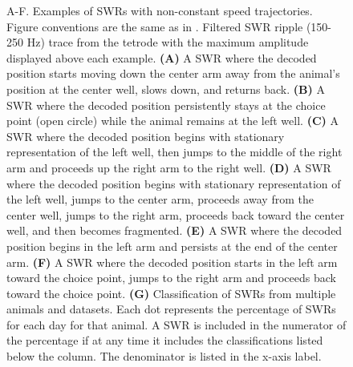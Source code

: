 \documentclass[9pt,lineno]{elife}
\begin{document}
\begin{figure}
\caption{A-F. Examples of SWRs with non-constant speed trajectories. Figure conventions are the same as in . Filtered SWR ripple (150-250 Hz) trace from the tetrode with the maximum amplitude displayed above each example. \textbf{(A)} A SWR where the decoded position starts moving down the center arm away from the animal's position at the center well, slows down, and returns back. \textbf{(B)} A SWR where the decoded position persistently stays at the choice point (open circle) while the animal remains at the left well. \textbf{(C)} A SWR where the decoded position begins with stationary representation of the left well, then jumps to the middle of the right arm and proceeds up the right arm to the right well. \textbf{(D)} A SWR where the decoded position begins with stationary representation of the left well, jumps to the center arm, proceeds away from the center well, jumps to the right arm, proceeds back toward the center well, and then becomes fragmented. \textbf{(E)} A SWR where the decoded position begins in the left arm and persists at the end of the center arm. \textbf{(F)} A SWR where the decoded position starts in the left arm toward the choice point, jumps to the right arm and proceeds back toward the choice point. \textbf{(G)} Classification of SWRs from multiple animals and datasets. Each dot represents the percentage of SWRs for each day for that animal. A SWR is included in the numerator of the percentage if at any time it includes the classifications listed below the column. The denominator is listed in the x-axis label.
}
\label{fig:3}


\end{figure}
\end{document}
